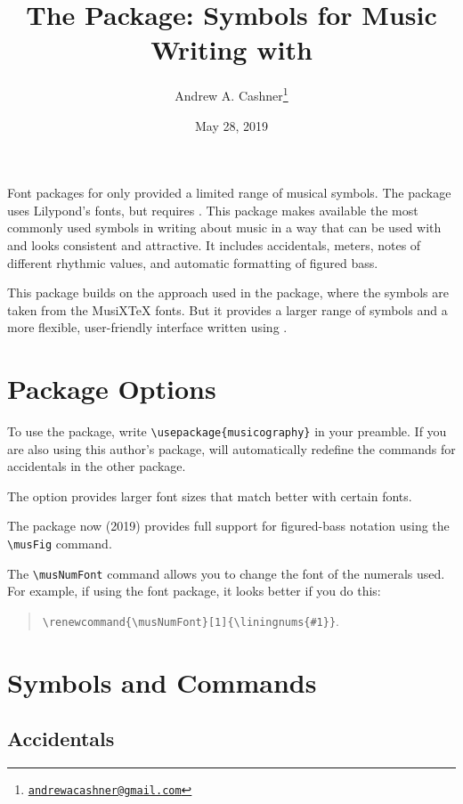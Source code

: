 \documentclass{article}
\title{The \code{musicography} Package: Symbols for Music Writing with
\code{pdflatex}}
\author{Andrew A. Cashner\thanks{%
    \href{mailto:andrewacashner@gmail.com}
    {\nolinkurl{andrewacashner@gmail.com}}%
    }%
}
\date{May 28, 2019}
\begin{document}
\maketitle

Font packages for  only provided a limited range of musical
symbols. 
The  package uses Lilypond's fonts, but requires
. 
This package makes available the most commonly used symbols in writing about
music in a way that can be used with  and looks consistent and
attractive.
It includes accidentals, meters, notes of different rhythmic values, and
automatic formatting of figured bass.

This package builds on the approach used in the  package, where
the symbols are taken from the MusiXTeX fonts.
But it provides a larger range of symbols and a more flexible, user-friendly
interface written using .

\tableofcontents

\section{Package Options}

To use the package, write \verb|\usepackage{musicography}| in your preamble.
If you are also using this author's  package, 
 will automatically redefine the commands for accidentals in
the other package.

The  option provides larger font sizes that match better with
certain fonts.

The package now (2019) provides full support for figured-bass notation using the
\verb|\musFig| command.

The \verb|\musNumFont| command allows you to change the font of the numerals
used.
For example, if using the  font package, it looks better if you
do this: 
\begin{quote}
    \verb|\renewcommand{\musNumFont}[1]{\liningnums{#1}}|.
\end{quote}


\section{Symbols and Commands}

\subsection{Accidentals}
\end{document}
